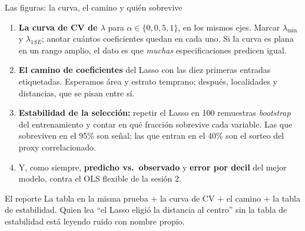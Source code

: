 \documentclass{beamer}
\newcommand{\1}{\mathbb{I}}
\begin{document}
\begin{frame}{Las figuras: la curva, el camino y quién sobrevive}
\small
\begin{enumerate}\itemsep4pt
  \item \textbf{La curva de CV de $\lambda$} para $\alpha \in \{0, 0{,}5, 1\}$, en los mismos ejes. Marcar $\lambda_{\min}$ y $\lambda_{1SE}$; anotar cuántos coeficientes quedan en cada uno. Si la curva es plana en un rango amplio, el dato es que \emph{muchas} especificaciones predicen igual. \pause
  \item \textbf{El camino de coeficientes} del Lasso con las diez primeras entradas etiquetadas. Esperamos área y estrato temprano; después, localidades y distancias, que se pisan entre sí. \pause
  \item \textbf{Estabilidad de la selección:} repetir el Lasso en 100 remuestras \emph{bootstrap} del entrenamiento y contar en qué fracción sobrevive cada variable. Las que sobreviven en el 95\% son señal; las que entran en el 40\% son el sorteo del proxy correlacionado. \pause
  \item Y, como siempre, \textbf{predicho vs.\ observado} y \textbf{error por decil} del mejor modelo, contra el OLS flexible de la sesión 2.
\end{enumerate}
\pause
\begin{block}{El reporte}
La tabla en la misma prueba $+$ la curva de CV $+$ el camino $+$ la tabla de estabilidad. Quien lea ``el Lasso eligió la distancia al centro'' sin la tabla de estabilidad está leyendo ruido con nombre propio.
\end{block}
\end{frame}
\end{document}
